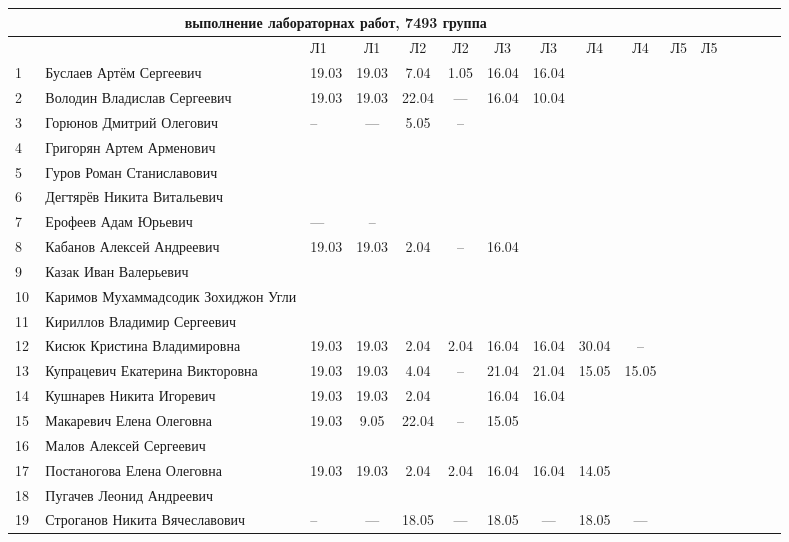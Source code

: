 \documentclass[a4paper,11pt]{article}
\begin{document}
%
\hspace{-6.1cm} %
\begin{tabular}{l|llccccccccccccc}
\multicolumn{10}{c}{выполнение лабораторнах работ, 7493 группа} \\
\toprule
&&Л1&Л1& Л2&Л2& Л3&Л3& Л4&Л4& Л5&Л5\\ 
\midrule
	1\,&Буслаев Артём Сергеевич               &19.03&19.03& 7.04& 1.05&16.04&16.04&& &&\\
2\,&Володин Владислав Сергеевич           &19.03&19.03&22.04& --- &16.04&10.04&&\\
3\,&Горюнов Дмитрий Олегович              &--   &---  & 5.05& --  &&&&\\
4\,&Григорян Артем Арменович              &&&&&&&&\\
5\,&Гуров Роман Станиславович             &&&&&&&&\\
\midrule
6\,&Дегтярёв Никита Витальевич            &&&&&&&&\\
7\,&Ерофеев Адам Юрьевич                  &---&--&&&&&&\\
8\,&Кабанов Алексей Андреевич             &19.03&19.03&2.04&--&16.04&&&\\
9\,&Казак Иван Валерьевич                 &&&&&&&&\\
10\,&Каримов Мухаммадсодик Зохиджон Угли  &&&&&&&&\\
\midrule
11\,&Кириллов Владимир Сергеевич          &&&&&&&&\\
12\,&Кисюк Кристина Владимировна          &19.03&19.03&2.04 &2.04&16.04&16.04&30.04& --\\
13\,&Купрацевич Екатерина Викторовна      &19.03&19.03& 4.04& --  &21.04&21.04&15.05&15.05\\
14\,&Кушнарев Никита Игоревич             &19.03&19.03& 2.04&     &16.04&16.04&&\\
15\,&Макаревич Елена Олеговна             &19.03& 9.05&22.04& --  &15.05&&&\\
\midrule
16\,&Малов Алексей Сергеевич              &&&&&&&&\\
17\,&Постаногова Елена Олеговна           &19.03&19.03&2.04&2.04&16.04&16.04&14.05&\\
18\,&Пугачев Леонид Андреевич             &&&&&&&&\\
19\,&Строганов Никита Вячеславович        &--&---&18.05& --- &18.05& --- &18.05& ---\\

\bottomrule
\end{tabular}

\newpage
{}
\recalctypearea
\end{document}
